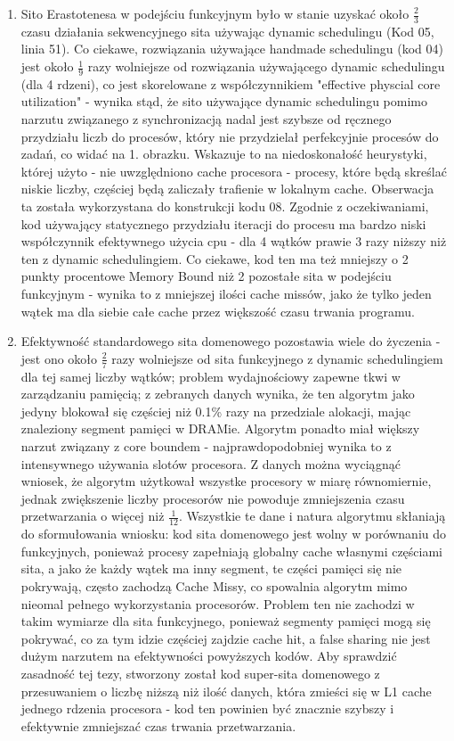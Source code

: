 \documentclass[12pt]{article}
\begin{document}
\begin{enumerate}
	\item Sito Erastotenesa w podejściu funkcyjnym było w stanie uzyskać około \(\frac{2}{3}\) czasu działania sekwencyjnego sita używając dynamic schedulingu (Kod 05, linia 51). Co ciekawe, rozwiązania używające handmade schedulingu (kod 04) jest około \(\frac{1}{9}\) razy wolniejsze od rozwiązania używającego dynamic schedulingu (dla 4 rdzeni), co jest skorelowane z współczynnikiem "effective physcial core utilization" - wynika stąd, że sito używające dynamic schedulingu pomimo narzutu związanego z synchronizacją nadal jest szybsze od ręcznego przydziału liczb do procesów, który nie przydzielał perfekcyjnie procesów do zadań, co widać na 1. obrazku. Wskazuje to na niedoskonałość heurystyki, której użyto - nie uwzględniono cache procesora - procesy, które będą skreślać niskie liczby, częściej będą zaliczały trafienie w lokalnym cache. Obserwacja ta została wykorzystana do konstrukcji kodu 08. Zgodnie z oczekiwaniami, kod używający statycznego przydziału iteracji do procesu ma bardzo niski współczynnik efektywnego użycia cpu - dla 4 wątków prawie 3 razy niższy niż ten z dynamic schedulingiem. Co ciekawe, kod ten ma też mniejszy o 2 punkty procentowe Memory Bound niż 2 pozostałe sita w podejściu funkcyjnym - wynika to z mniejszej ilości cache missów, jako że tylko jeden wątek ma dla siebie całe cache przez większość czasu trwania programu.
	
	\item Efektywność standardowego sita domenowego pozostawia wiele do życzenia - jest ono około \(\frac{2}{7}\) razy wolniejsze od sita funkcyjnego z dynamic schedulingiem dla tej samej liczby wątków; problem wydajnościowy zapewne tkwi w zarządzaniu pamięcią; z zebranych danych wynika, że ten algorytm jako jedyny blokował się częściej niż 0.1\% razy na przedziale alokacji, mając znaleziony segment pamięci w DRAMie. Algorytm ponadto miał większy narzut związany z core boundem - najprawdopodobniej wynika to z intensywnego używania slotów procesora. Z danych można wyciągnąć wniosek, że algorytm użytkował wszystke procesory w miarę równomiernie, jednak zwiększenie liczby procesorów nie powoduje zmniejszenia czasu przetwarzania o więcej niż \(\frac{1}{12}\). Wszystkie te dane i natura algorytmu skłaniają do sformułowania wniosku: kod sita domenowego jest wolny w porównaniu do funkcyjnych, ponieważ procesy zapełniają globalny cache własnymi częściami sita, a jako że każdy wątek ma inny segment, te części pamięci się nie pokrywają, często zachodzą Cache Missy, co spowalnia algorytm mimo nieomal pełnego wykorzystania procesorów. Problem ten nie zachodzi w takim wymiarze dla sita funkcyjnego, ponieważ segmenty pamięci mogą się pokrywać, co za tym idzie częściej zajdzie cache hit, a false sharing nie jest dużym narzutem na efektywności powyższych kodów. Aby sprawdzić zasadność tej tezy, stworzony został kod super-sita domenowego z przesuwaniem o liczbę niższą niż ilość danych, która zmieści się w L1 cache jednego rdzenia procesora - kod ten powinien być znacznie szybszy i efektywnie zmniejszać czas trwania przetwarzania.
	

\end{enumerate}
\end{document}
